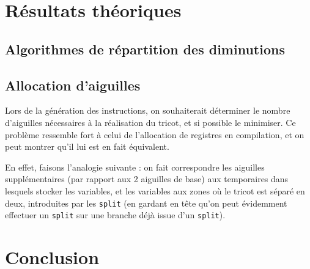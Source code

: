 \documentclass{article}
\begin{document}
\section{Résultats théoriques}

\subsection{Algorithmes de répartition des diminutions}

\subsection{Allocation d'aiguilles}

Lors de la génération des instructions, on souhaiterait déterminer le nombre d'aiguilles nécessaires à la réalisation du tricot, 
et si possible le minimiser. Ce problème ressemble fort à celui de l'allocation de registres en compilation, et on peut montrer 
qu'il lui est en fait équivalent.

En effet, faisons l'analogie suivante : on fait correspondre les aiguilles supplémentaires (par rapport aux 2 aiguilles de base) 
aux temporaires dans lesquels stocker les variables, et les variables aux zones où le tricot est séparé en deux, introduites par 
les \texttt{split} (en gardant en tête qu'on peut évidemment effectuer un \texttt{split} sur une branche déjà issue d'un \texttt{split}).

\section*{Conclusion}
\end{document}
